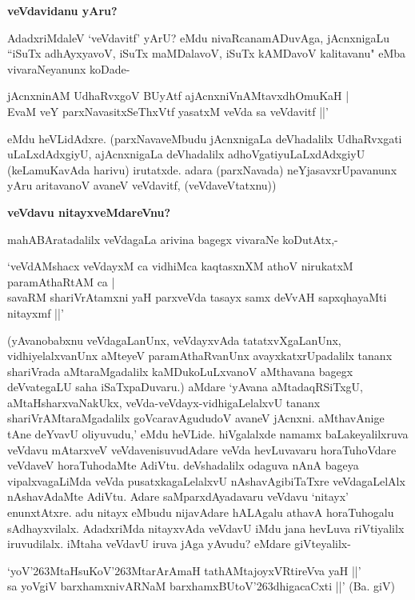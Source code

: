 {\bf veVdavidanu yAru?}

AdadxriMdaleV `veVdavitf' yArU? eMdu nivaRcanamADuvAga, jAcnxnigaLu ``iSuTx adhAyxyavoV, iSuTx maMDalavoV, iSuTx kAMDavoV kalitavanu" eMba vivaraNeyanunx koDade-

\begin{shloka}
jAcnxninAM UdhaRvxgoV BUyAtf ajAcnxniVnAMtavxdhOmuKaH |\\
EvaM veY parxNavasitxSeThxVtf yasatxM veVda sa veVdavitf ||'
\end{shloka}

eMdu heVLidAdxre. (parxNavaveMbudu jAcnxnigaLa deVhadalilx UdhaRvxgati uLaLxdAdxgiyU, ajAcnxnigaLa deVhadalilx adhoVgatiyuLaLxdAdxgiyU (keLamuKavAda harivu) irutatxde. adara (parxNavada) neYjasavxrUpavanunx yAru aritavanoV avaneV veVdavitf, (veVdaveVtatxnu))

{\bf veVdavu nitayxveMdareVnu?}

mahABAratadalilx veVdagaLa arivina bagegx vivaraNe koDutAtx,-

\begin{shloka}
`veVdAMshacx veVdayxM ca vidhiMca kaqtasxnXM athoV nirukatxM paramAthaRtAM ca |\\
savaRM shariVrAtamxni yaH parxveVda tasayx samx deVvAH sapxqhayaMti nitayxmf ||'
\end{shloka}

(yAvanobabxnu veVdagaLanUnx, veVdayxvAda tatatxvXgaLanUnx, vidhiyelalxvanUnx aMteyeV paramAthaRvanUnx avayxkatxrUpadalilx tananx shariVrada aMtaraMgadalilx kaMDukoLuLxvanoV aMthavana bagegx deVvategaLU saha iSaTxpaDuvaru.) aMdare `yAvana aMtadaqRSiTxgU, aMtaHsharxvaNakUkx, veVda-veVdayx-vidhigaLelalxvU tananx shariVrAMtaraMgadalilx goVcaravAgududoV avaneV jAcnxni. aMthavAnige tAne deYvavU oliyuvudu,' eMdu heVLide. hiVgalalxde namamx baLakeyalilxruva veVdavu mAtarxveV veVdavenisuvudAdare veVda hevLuvavaru horaTuhoVdare veVdaveV horaTuhodaMte AdiVtu. deVshadalilx odaguva nAnA bageya vipalxvagaLiMda veVda pusatxkagaLelalxvU nAshavAgibiTaTxre veVdagaLelAlx nAshavAdaMte AdiVtu. Adare saMparxdAyadavaru veVdavu `nitayx' enunxtAtxre. adu nitayx eMbudu nijavAdare hALAgalu athavA horaTuhogalu sAdhayxvilalx. AdadxriMda nitayxvAda veVdavU iMdu jana hevLuva riVtiyalilx iruvudilalx. iMtaha veVdavU iruva jAga yAvudu? eMdare giVteyalilx-

\begin{shloka}
`yoV\char'263MtaHsuKoV\char'263MtarArAmaH tathAMtajoyxVRtireVva yaH ||'\\
sa yoVgiV barxhamxnivARNaM barxhamxBUtoV\char'263dhigacaCxti ||' (Ba. giV)
\end{shloka}

